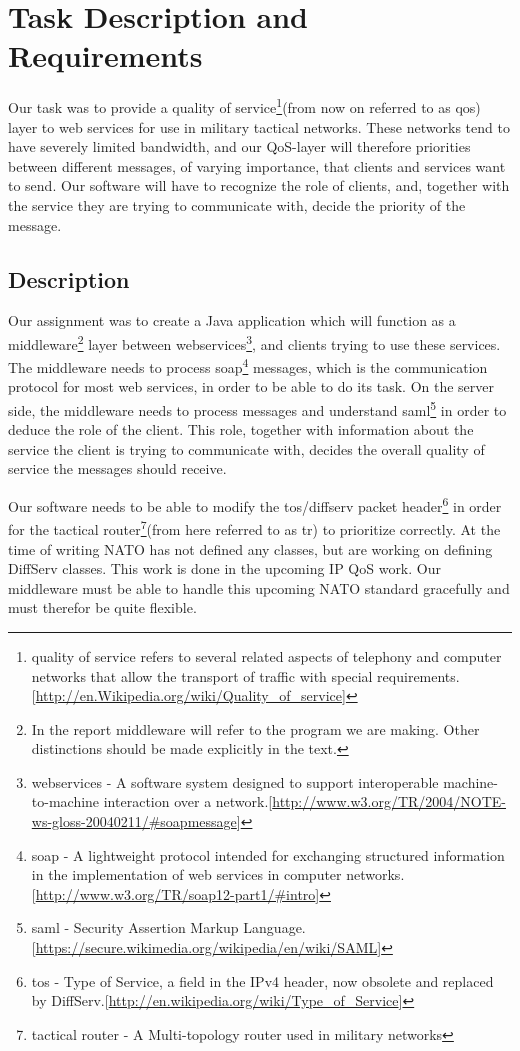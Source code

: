 \section{Task Description and Requirements}\label{Task Description and Requirements} 
    Our task was to provide a \gls{quality of service}\footnote{\gls{quality of service} refers to several related aspects of telephony and computer networks that allow the transport of traffic with special requirements.[\url{http://en.Wikipedia.org/wiki/Quality_of_service}]}(from now on referred to as \gls{qos}) layer to web services for use in military tactical networks. These networks tend to have severely limited bandwidth, and our QoS-layer will therefore priorities between different messages, of varying importance, that clients and services want to send. Our software will have to recognize the role of clients, and, together with the service they are trying to communicate with, decide the priority of the message.
    
    \subsection{Description}\label{Description}        
    Our assignment was to create a Java application which will function as a \gls{middleware}\footnote{In the report \gls{middleware} will refer to the program we are making. Other distinctions should be made explicitly in the text.} layer between \glspl{webservice}\footnote{\glspl{webservice} - A software system designed to support interoperable machine-to-machine interaction over a network.[\url{http://www.w3.org/TR/2004/NOTE-ws-gloss-20040211/\#soapmessage}]}, and clients trying to use these services. The middleware needs to process \gls{soap}\footnote{\gls{soap} - A lightweight protocol intended for exchanging structured information in the implementation of web services in computer networks.[\url{http://www.w3.org/TR/soap12-part1/\#intro}]} messages, which is the communication protocol for most web services, in order to be able to do its task. On the server side, the middleware needs to process messages and understand \gls{saml}\footnote{\gls{saml} - Security Assertion Markup Language.[\url{https://secure.wikimedia.org/wikipedia/en/wiki/SAML}]} in order to deduce the role of the client. This role, together with information about the service the client is trying to communicate with, decides the overall quality of service the messages should receive. 

    Our software needs to be able to modify the \gls{tos}/\gls{diffserv} \gls{packet} header\footnote{\gls{tos} - Type of Service, a field in the IPv4 header, now obsolete and replaced by DiffServ.[\url{http://en.wikipedia.org/wiki/Type_of_Service}]} in order for the \Gls{tactical router}\footnote{\Gls{tactical router} - A Multi-topology router used in military networks}(from here referred to as \gls{tr}) to prioritize correctly. At the time of writing NATO has not defined any classes, but are working on defining DiffServ classes. This work is done in the upcoming IP QoS work. Our middleware must be able to handle this upcoming NATO standard gracefully and must therefor be quite flexible.

